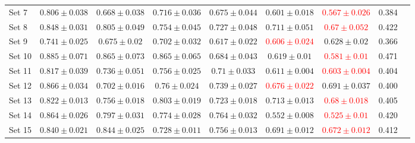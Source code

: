 {\begin{tabular}{lcccccccc}
Set 7  & $0.806 \pm 0.038$ & $0.668 \pm 0.038$ & $0.716 \pm 0.036$                        & $0.675 \pm 0.044$                         & $0.601 \pm 0.018$                         & \textcolor{red}{$0.567 \pm 0.026$} &   0.384       &  \\
Set 8  & $0.848 \pm 0.031$ & $0.805 \pm 0.049$ & $0.754 \pm 0.045$                        & $0.727 \pm 0.048$                         & $0.711 \pm 0.051$                         & \textcolor{red}{$0.67 \pm 0.052$}  &   0.422       &  \\
Set 9  & $0.741 \pm 0.025$ & $0.675 \pm 0.02$  & $0.702 \pm 0.032$                        & $0.617 \pm 0.022$                         & \textcolor{red}{$0.606 \pm 0.024$} & $0.628 \pm 0.02$                          &   0.366       &  \\
Set 10 & $0.885 \pm 0.071$ & $0.865 \pm 0.073$ & $0.865 \pm 0.065$                        & $0.684 \pm 0.043$                         & $0.619 \pm 0.01$                          & \textcolor{red}{$0.581 \pm 0.01$}    & 0.471       &  \\
Set 11 & $0.817 \pm 0.039$ & $0.736 \pm 0.051$ & $0.756 \pm 0.025$                        & $0.71 \pm 0.033$                          & $0.611 \pm 0.004$                         & \textcolor{red}{$0.603 \pm 0.004$}   & 0.404       &  \\
Set 12 & $0.866 \pm 0.034$ & $0.702 \pm 0.016$ & $0.76 \pm 0.024$                         & $0.739 \pm 0.027$                         & \textcolor{red}{$0.676 \pm 0.022$} & $0.691 \pm 0.037$                         &   0.400       &  \\
Set 13 & $0.822 \pm 0.013$ & $0.756 \pm 0.018$ & $0.803 \pm 0.019$                        & $0.723 \pm 0.018$                         & $0.713 \pm 0.013$                         & \textcolor{red}{$0.68 \pm 0.018$}  &   0.405       &  \\
Set 14 & $0.864 \pm 0.026$ & $0.797 \pm 0.031$ & $0.774 \pm 0.028$                        & $0.764 \pm 0.032$                         & $0.552 \pm 0.008$                         & \textcolor{red}{$0.525 \pm 0.01$}  &   0.420       &  \\
Set 15 & $0.840 \pm 0.021$ & $0.844 \pm 0.025$ & $0.728 \pm 0.011$                        & $0.756 \pm 0.013$                         & $0.691 \pm 0.012$                         & \textcolor{red}{$0.672 \pm 0.012$} &   0.412       & \\ %
\end{tabular}
}



